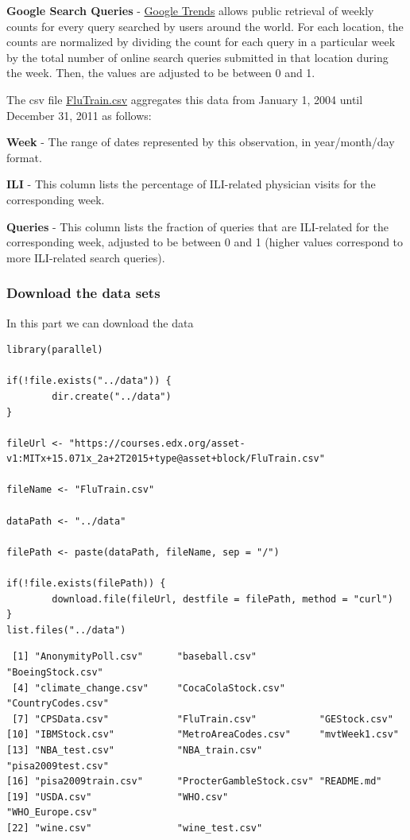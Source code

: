 \documentclass[letterpaper, 9pt, onecolumn, twoside, technote, final]{IEEEtran}
\begin{document}
\textbf{Google Search Queries} - \href{http://www.google.com/trends}{Google Trends} allows public retrieval of
weekly counts for every query searched by users around the world. For
each location, the counts are normalized by dividing the count for
each query in a particular week by the total number of online search
queries submitted in that location during the week. Then, the values
are adjusted to be between 0 and 1.

The csv file \href{https://courses.edx.org/asset-v1:MITx\%2B15.071x_2a\%2B2T2015\%2Btype@asset\%2Bblock/FluTrain.csv}{FluTrain.csv} aggregates this data from January 1, 2004
until December 31, 2011 as follows:

\textbf{Week} - The range of dates represented by this observation, in
year/month/day format.

\textbf{ILI} - This column lists the percentage of ILI-related physician
visits for the corresponding week.

\textbf{Queries} - This column lists the fraction of queries that are
ILI-related for the corresponding week, adjusted to be between 0 and 1
(higher values correspond to more ILI-related search queries).

\subsubsection{Download the data sets}
\label{sec-3-1-1}

In this part we can download the data

\begin{verbatim}
library(parallel)

if(!file.exists("../data")) {
        dir.create("../data")
}

fileUrl <- "https://courses.edx.org/asset-v1:MITx+15.071x_2a+2T2015+type@asset+block/FluTrain.csv"

fileName <- "FluTrain.csv"

dataPath <- "../data"

filePath <- paste(dataPath, fileName, sep = "/")

if(!file.exists(filePath)) {
        download.file(fileUrl, destfile = filePath, method = "curl")
}
list.files("../data")
\end{verbatim}

\begin{verbatim}
 [1] "AnonymityPoll.csv"      "baseball.csv"           "BoeingStock.csv"
 [4] "climate_change.csv"     "CocaColaStock.csv"      "CountryCodes.csv"
 [7] "CPSData.csv"            "FluTrain.csv"           "GEStock.csv"
[10] "IBMStock.csv"           "MetroAreaCodes.csv"     "mvtWeek1.csv"
[13] "NBA_test.csv"           "NBA_train.csv"          "pisa2009test.csv"
[16] "pisa2009train.csv"      "ProcterGambleStock.csv" "README.md"
[19] "USDA.csv"               "WHO.csv"                "WHO_Europe.csv"
[22] "wine.csv"               "wine_test.csv"
\end{verbatim}
\end{document}
